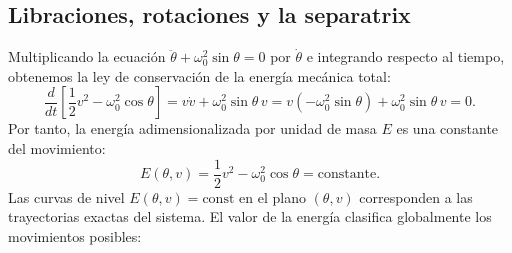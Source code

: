 \subsection{Libraciones, rotaciones y la separatrix}

Multiplicando la ecuación $\ddot{\theta} + \omega_0^2 \sin\theta = 0$ por $\dot{\theta}$ e integrando respecto al tiempo, obtenemos la ley de conservación de la energía mecánica total:
\begin{equation}
    \frac{d}{dt}\left[ \frac{1}{2}v^2 - \omega_0^2 \cos\theta \right] = v \dot{v} + \omega_0^2 \sin\theta \, v = v(-\omega_0^2 \sin\theta) + \omega_0^2 \sin\theta \, v = 0.
\end{equation}
Por tanto, la energía adimensionalizada por unidad de masa $E$ es una constante del movimiento:
\begin{equation}
    E(\theta, v) = \frac{1}{2}v^2 - \omega_0^2 \cos\theta = \text{constante}.
    \label{eq:energia_pendulo}
\end{equation}
Las curvas de nivel $E(\theta, v) = \text{const}$ en el plano $(\theta, v)$ corresponden a las trayectorias exactas del sistema. El valor de la energía clasifica globalmente los movimientos posibles:

